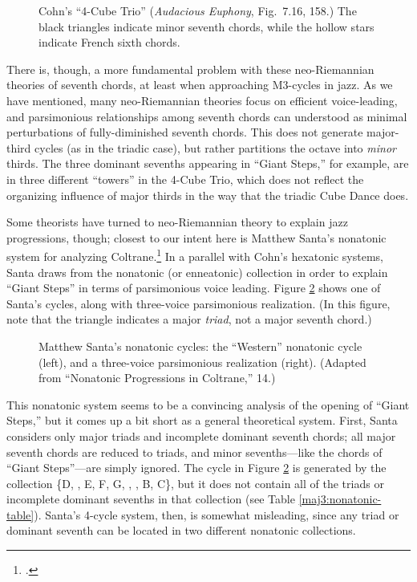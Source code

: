 \begin{figure}[tbp]
  \caption[Cohn's ``4-Cube Trio'']{Cohn's ``4-Cube Trio'' (\emph{Audacious
    Euphony}, Fig.~7.16, 158.) The black triangles indicate minor seventh chords,
    while the hollow stars indicate French sixth chords.}
  \label{maj3:four-cube-trio}
\end{figure}

There is, though, a more fundamental problem with these neo-Riemannian theories
of seventh chords, at least when approaching M3-cycles in jazz. As we have
mentioned, many neo-Riemannian theories focus on
efficient voice-leading, and parsimonious relationships among seventh chords
can understood as minimal perturbations of fully-diminished seventh
chords. This does not generate major-third cycles (as in the
triadic case), but rather partitions the octave into \emph{minor} thirds. The
three dominant sevenths appearing in ``Giant Steps,'' for example, are in
three different ``towers'' in the 4-Cube Trio, which does not reflect
the organizing influence of major thirds in the way that the triadic Cube
Dance does.

Some theorists have turned to neo-Riemannian theory to explain jazz
progressions, though; closest to our intent here is Matthew Santa's nonatonic
system for analyzing Coltrane.\footcite{santa:2003} In a parallel with Cohn's
hexatonic systems, Santa draws from the nonatonic (or enneatonic) collection
in order to explain ``Giant Steps'' in terms of parsimonious voice leading.
Figure \ref{maj3:nonatonic-cycle} shows one of Santa's cycles, along with
three-voice parsimonious realization. (In this figure, note that the triangle
indicates a major \emph{triad}, not a major seventh chord.)
%
\begin{figure}[tbp]
  \caption[Matthew Santa's nonatonic cycles.]{Matthew Santa's nonatonic
    cycles: the ``Western'' nonatonic cycle (left), and a three-voice parsimonious
    realization (right). (Adapted from ``Nonatonic Progressions in Coltrane,''
    14.)}
\label{maj3:nonatonic-cycle}
\end{figure}
%
This nonatonic system seems to be a convincing analysis of the opening of
``Giant Steps,'' but it comes up a bit short as a general theoretical system.
First, Santa considers only major triads and incomplete dominant seventh
chords; all major seventh chords are reduced to triads, and minor
sevenths---like the \ii chords of ``Giant Steps''---are simply
ignored. The cycle in Figure \ref{maj3:nonatonic-cycle} is
generated by the collection \{D, \Eflat, E, F\sharp, G, \Aflat, \Bflat, B,
C\}, but it does not contain all of the triads or incomplete dominant sevenths
in that collection (see Table \ref{maj3:nonatonic-table}). Santa's 4-cycle
system, then, is somewhat misleading, since any triad or dominant seventh can
be located in two different nonatonic collections.

